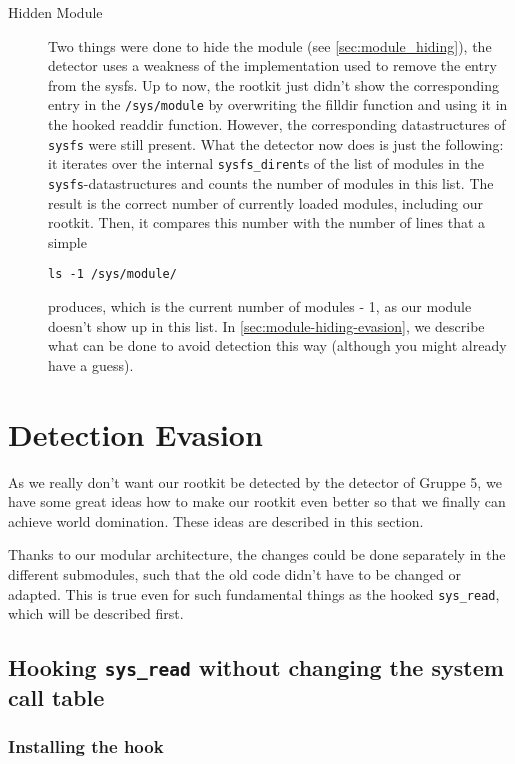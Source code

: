 \documentclass[10pt, letterpaper]{article}
\begin{document}
\begin{description}
\item[Hidden Module] Two things were done to hide the module (see \autoref{sec:module_hiding}), the detector uses a weakness of the implementation used to remove the entry from the sysfs. Up to now, the rootkit just didn't show the corresponding entry in the \texttt{/sys/module} by overwriting the filldir function and using it in the hooked readdir function. However, the corresponding datastructures of \texttt{sysfs} were still present. What the detector now does is just the following: it iterates over the internal \texttt{sysfs\_dirent}s of the list of modules in the \texttt{sysfs}-datastructures and counts the number of modules in this list. The result is the correct number of currently loaded modules, including our rootkit. Then, it compares this number with the number of lines that a simple 
\begin{verbatim}
ls -1 /sys/module/
\end{verbatim}
produces, which is the current number of modules - 1, as our module doesn't show up in this list. In \autoref{sec:module-hiding-evasion}, we describe what can be done to avoid detection this way (although you might already have a guess).

\end{description}

\section{Detection Evasion}
\label{sec:detection-evasion}
As we really don't want our rootkit be detected by the detector of Gruppe 5, we have some great ideas how to make our rootkit even better so that we finally can achieve world domination. These ideas are described in this section.

Thanks to our modular architecture, the changes could be done separately in the different submodules, such that the old code didn't have to be changed or adapted. This is true even for such fundamental things as the hooked \texttt{sys\_read}, which will be described first.

\subsection{Hooking \texttt{sys\_read} without changing the system call table}
\label{sec:hooking-read-2}

\subsubsection{Installing the hook}
\label{sec:hooking-read-install-hook}
\end{document}
